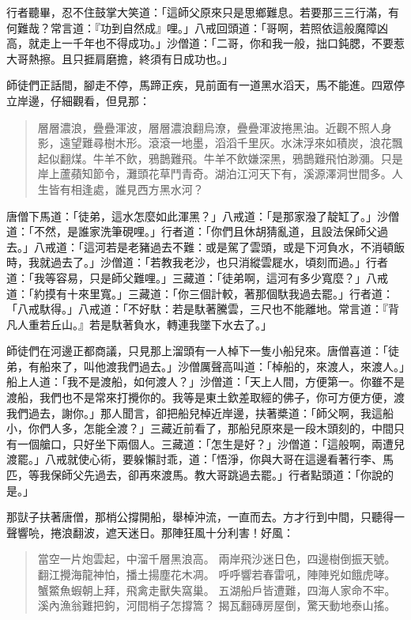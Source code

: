 行者聽畢，忍不住鼓掌大笑道：「這師父原來只是思鄉難息。若要那三三行滿，有何難哉？常言道：『功到自然成』哩。」八戒回頭道：「哥啊，若照依這般魔障凶高，就走上一千年也不得成功。」沙僧道：「二哥，你和我一般，拙口鈍腮，不要惹大哥熱擦。且只捱肩磨擔，終須有日成功也。」

師徒們正話間，腳走不停，馬蹄正疾，見前面有一道黑水滔天，馬不能進。四眾停立岸邊，仔細觀看，但見那：
\begin{quote}
層層濃浪，疊疊渾波，層層濃浪翻烏潦，疊疊渾波捲黑油。近觀不照人身影，遠望難尋樹木形。滾滾一地墨，滔滔千里灰。水沫浮來如積炭，浪花飄起似翻煤。牛羊不飲，鴉鵲難飛。牛羊不飲嫌深黑，鴉鵲難飛怕渺瀰。只是岸上蘆蘋知節令，灘頭花草鬥青奇。湖泊江河天下有，溪源澤洞世間多。人生皆有相逢處，誰見西方黑水河？
\end{quote}

唐僧下馬道：「徒弟，這水怎麼如此渾黑？」八戒道：「是那家潑了靛缸了。」沙僧道：「不然，是誰家洗筆硯哩。」行者道：「你們且休胡猜亂道，且設法保師父過去。」八戒道：「這河若是老豬過去不難：或是駕了雲頭，或是下河負水，不消頓飯時，我就過去了。」沙僧道：「若教我老沙，也只消縱雲屣水，頃刻而過。」行者道：「我等容易，只是師父難哩。」三藏道：「徒弟啊，這河有多少寬麼？」八戒道：「約摸有十來里寬。」三藏道：「你三個計較，著那個馱我過去罷。」行者道：「八戒馱得。」八戒道：「不好馱：若是馱著騰雲，三尺也不能離地。常言道：『背凡人重若丘山。』若是馱著負水，轉連我墜下水去了。」

師徒們在河邊正都商議，只見那上溜頭有一人棹下一隻小船兒來。唐僧喜道：「徒弟，有船來了，叫他渡我們過去。」沙僧厲聲高叫道：「棹船的，來渡人，來渡人。」船上人道：「我不是渡船，如何渡人？」沙僧道：「天上人間，方便第一。你雖不是渡船，我們也不是常來打攪你的。我等是東土欽差取經的佛子，你可方便方便，渡我們過去，謝你。」那人聞言，卻把船兒棹近岸邊，扶著槳道：「師父啊，我這船小，你們人多，怎能全渡？」三藏近前看了，那船兒原來是一段木頭刻的，中間只有一個艙口，只好坐下兩個人。三藏道：「怎生是好？」沙僧道：「這般啊，兩遭兒渡罷。」八戒就使心術，要躲懶討乖，道：「悟淨，你與大哥在這邊看著行李、馬匹，等我保師父先過去，卻再來渡馬。教大哥跳過去罷。」行者點頭道：「你說的是。」

那獃子扶著唐僧，那梢公撐開船，舉棹沖流，一直而去。方才行到中間，只聽得一聲響喨，捲浪翻波，遮天迷日。那陣狂風十分利害！好風：
\begin{quote}
當空一片炮雲起，中溜千層黑浪高。
兩岸飛沙迷日色，四邊樹倒振天號。
翻江攪海龍神怕，播土揚塵花木凋。
呼呼響若春雷吼，陣陣兇如餓虎哮。
蟹鱉魚蝦朝上拜，飛禽走獸失窩巢。
五湖船戶皆遭難，四海人家命不牢。
溪內漁翁難把鉤，河間梢子怎撐篙？
揭瓦翻磚房屋倒，驚天動地泰山搖。
\end{quote}

